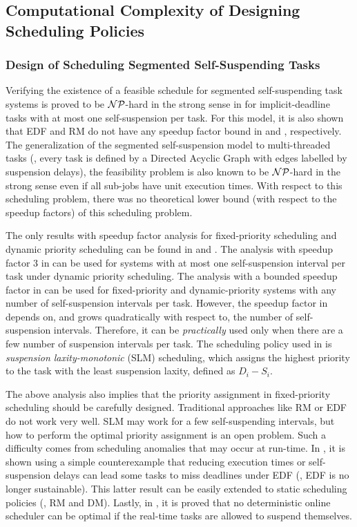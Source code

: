 \subsection{Computational Complexity of Designing Scheduling Policies}

\subsubsection{Design of Scheduling Segmented Self-Suspending Tasks}
Verifying the existence of a feasible schedule for segmented self-suspending task systems is proved to be ${\cal NP}$-hard in the strong sense in \cite{Ridouard_2004} for implicit-deadline tasks with at most one self-suspension per task. For this model, it is also shown that EDF and RM do not have any speedup factor bound in \cite{Ridouard_2004} and \cite{RTSS-ChenL14}, respectively. The generalization of the segmented self-suspension model to multi-threaded tasks (\ie, every task is defined by a Directed Acyclic Graph with edges labelled by suspension delays), the feasibility problem is also known to be  ${\cal NP}$-hard in the strong sense  \cite{Ric03} even if all sub-jobs have unit execution times. With respect to this scheduling problem, there was no theoretical lower bound (with respect to the speedup factors) of this scheduling problem. 

 The only results with speedup factor analysis for fixed-priority scheduling and dynamic priority scheduling can be found in \cite{RTSS-ChenL14} and \cite{WC16-suspend-DATE}. The analysis with speedup factor $3$ in \cite{RTSS-ChenL14} can be used for systems with at most one self-suspension interval per task under dynamic priority scheduling. The analysis with a bounded speedup factor in \cite{WC16-suspend-DATE} can be used for fixed-priority and dynamic-priority systems with any number of self-suspension intervals per task. However, the speedup factor in \cite{WC16-suspend-DATE} depends on, and grows quadratically with respect to, the number of self-suspension intervals. Therefore, it can be \emph{practically} used only  when there are  a few number of suspension intervals per task. The scheduling policy used in \cite{WC16-suspend-DATE} is \emph{suspension laxity-monotonic} (SLM) scheduling, which assigns the highest priority to the task with the least suspension laxity, defined as $D_i-S_i$.


The above analysis also implies that the priority assignment in fixed-priority scheduling should be carefully designed. Traditional approaches like RM or EDF do not work very well. SLM may work for a few self-suspending intervals, but how to perform the optimal priority assignment is an open problem. Such a difficulty comes from scheduling anomalies that may occur at run-time. In \cite{Ridouard_2004}, it is shown using a simple counterexample that reducing execution times or self-suspension delays can lead some tasks to miss deadlines under EDF (\ie, EDF is no longer sustainable). This latter result can be easily extended to static scheduling policies (\ie, RM and DM). Lastly, in \cite{RidouardR06}, it is proved that no deterministic online scheduler can be optimal if the real-time tasks are allowed to suspend themselves.



